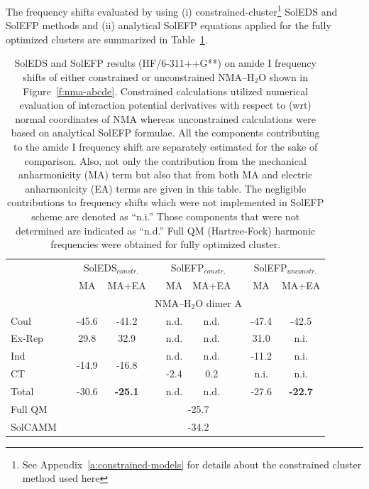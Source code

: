 \documentclass[a4paper,titlepage,twoside,fleqn,12pt]{book}
\begin{document}
\begin{refsection}
The frequency
shifts evaluated by using (i) constrained\hyp{}cluster\footnote{See Appendix~\ref{a:constrained-models} for details about
the constrained cluster method used here} SolEDS and
SolEFP methods and (ii) analytical SolEFP equations applied
for the fully optimized clusters are summarized in Table~\ref{t:amide-I-soleds-solefp}.
%
\begin{table}[t!]
\caption{
SolEDS and SolEFP results (HF/6-311++G**) 
on amide I frequency shifts of either constrained or unconstrained NMA--H$_2$O%
shown in Figure~\ref{f:nma-abcde}. 
Constrained calculations
utilized numerical evaluation of interaction potential derivatives with respect to (wrt) normal coordinates of NMA whereas unconstrained calculations were
based on analytical SolEFP formulae. All the components contributing to the amide I frequency shift are separately
estimated for the sake of comparison. Also, not only the contribution from the mechanical anharmonicity (MA) term but also that from both MA and electric
anharmonicity (EA) terms are given in this table. The negligible contributions to frequency shifts which were not implemented in SolEFP scheme are denoted
as “n.i.” Those components that were not determined are indicated
as “n.d.” Full QM (Hartree-Fock) harmonic frequencies were obtained for fully optimized cluster.
\label{t:amide-I-soleds-solefp}}
\begin{tabular*}{1.0\textwidth}{@{\extracolsep{\fill} } l ccccccccc }
\hline\hline
 && \multicolumn{2}{c}{SolEDS$_{constr.}$} && \multicolumn{2}{c}{SolEFP$_{constr.}$} && \multicolumn{2}{c}{SolEFP$_{unconstr.}$} \\
\cline{3-4}
\cline{6-7}
\cline{9-10}
 && MA & MA+EA && MA & MA+EA && MA & MA+EA \\
\hline
 && \multicolumn{8}{c}{NMA--H$_2$O dimer A} \\
\cline{3-10}
Coul   && -45.6 & -41.2 &&  n.d. & n.d. && -47.4 & -42.5 \\
Ex-Rep &&  29.8 &  32.9 &&  n.d. & n.d. &&  31.0 &  n.i. \\
Ind    &&  \multirow{2}{*}{-14.9}& \multirow{2}{*}{-16.8} && n.d. & n.d. && -11.2 & n.i. \\
CT     &&       &       && -2.4  & 0.2  &&  n.i. &  n.i. \\
Total  && -30.6 & \bf{-25.1} &&  n.d. & n.d. && -27.6 & \bf{-22.7} \\
Full QM&& \multicolumn{8}{c}{-25.7} \\
SolCAMM&& \multicolumn{8}{c}{-34.2} \\

\end{tabular*}
\end{table}
\end{refsection}
\end{document}
